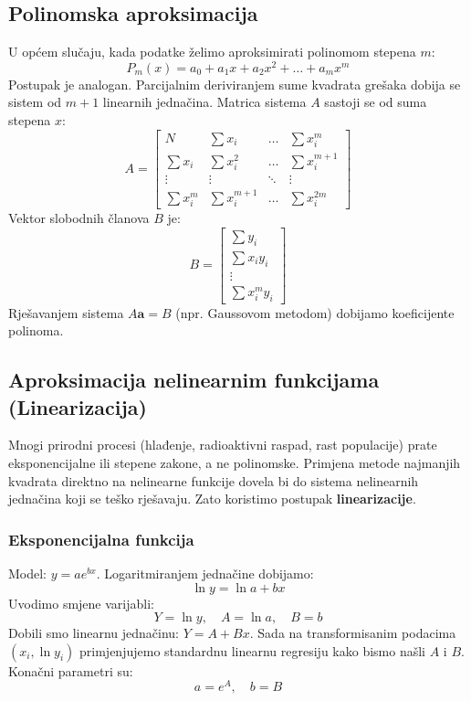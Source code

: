 \documentclass[12pt, a4paper]{article}
\begin{document}
\subsection{Polinomska aproksimacija}
U općem slučaju, kada podatke želimo aproksimirati polinomom stepena $m$:
\begin{equation}
    P_m(x) = a_0 + a_1 x + a_2 x^2 + \dots + a_m x^m
\end{equation}
Postupak je analogan. Parcijalnim deriviranjem sume kvadrata grešaka dobija se sistem od $m+1$ linearnih jednačina. Matrica sistema $A$ sastoji se od suma stepena $x$:
\begin{equation}
    A = \begin{bmatrix}
    N & \sum x_i & \dots & \sum x_i^m \\
    \sum x_i & \sum x_i^2 & \dots & \sum x_i^{m+1} \\
    \vdots & \vdots & \ddots & \vdots \\
    \sum x_i^m & \sum x_i^{m+1} & \dots & \sum x_i^{2m}
    \end{bmatrix}
\end{equation}
Vektor slobodnih članova $B$ je:
\begin{equation}
    B = \begin{bmatrix}
    \sum y_i \\ \sum x_i y_i \\ \vdots \\ \sum x_i^m y_i
    \end{bmatrix}
\end{equation}
Rješavanjem sistema $A\mathbf{a} = B$ (npr. Gaussovom metodom) dobijamo koeficijente polinoma.

\subsection{Aproksimacija nelinearnim funkcijama (Linearizacija)}
Mnogi prirodni procesi (hlađenje, radioaktivni raspad, rast populacije) prate eksponencijalne ili stepene zakone, a ne polinomske. Primjena metode najmanjih kvadrata direktno na nelinearne funkcije dovela bi do sistema nelinearnih jednačina koji se teško rješavaju. Zato koristimo postupak \textbf{linearizacije}.

\subsubsection{Eksponencijalna funkcija}
Model: $y = a e^{bx}$.
Logaritmiranjem jednačine dobijamo:
\begin{equation}
    \ln y = \ln a + bx
\end{equation}
Uvodimo smjene varijabli:
$$ Y = \ln y, \quad A = \ln a, \quad B = b $$
Dobili smo linearnu jednačinu: $Y = A + Bx$. Sada na transformisanim podacima $(x_i, \ln y_i)$ primjenjujemo standardnu linearnu regresiju kako bismo našli $A$ i $B$. Konačni parametri su:
$$ a = e^A, \quad b = B $$
\end{document}

